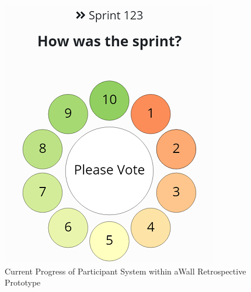 \begin{itemize}
\begin{figure}[ht]
\includegraphics{participant_progress}
\centering
\caption{Current Progress of Participant System within aWall Retrospective Prototype}
\end{figure}
\end{itemize}
